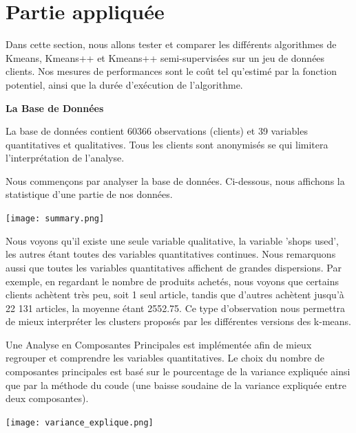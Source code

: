 \documentclass[12pt,a4paper]{book}
\newcommand{\1}{\mathds{1}}
\begin{document}
\section{Partie appliquée}

\vspace{5 mm}

\noindent
Dans cette section, nous allons tester et comparer les différents algorithmes de Kmeans, Kmeans++ et Kmeans++ semi-supervisées sur un jeu de données clients. Nos mesures de performances sont le coût tel qu'estimé par la fonction potentiel, ainsi que la durée d'exécution de l'algorithme.

\vspace{10 mm}

\noindent
{\Large \textbf{La Base de Données}}
\vspace{5 mm}

\noindent
La base de données contient 60366 observations (clients) et 39 variables quantitatives et qualitatives. Tous les clients sont anonymisés se qui limitera l'interprétation de l'analyse.

\noindent
Nous commençons par analyser la base de données. Ci-dessous, nous affichons la statistique d'une partie de nos données. 
\begin{center}
\texttt{[image: summary.png]}
\end{center}

\noindent
Nous voyons qu'il existe une seule variable qualitative, la variable 'shops used', les autres étant toutes des variables quantitatives continues. Nous remarquons aussi que toutes les variables quantitatives affichent de grandes dispersions. Par exemple, en regardant le nombre de produits achetés, nous voyons que certains clients achètent très peu, soit 1 seul article, tandis que d'autres achètent jusqu'à 22 131 articles, la moyenne étant 2552.75. Ce type d'observation nous permettra de mieux interpréter les clusters proposés par les différentes versions des k-means.

\noindent
Une Analyse en Composantes Principales est implémentée afin de mieux regrouper et comprendre les variables quantitatives. Le choix du nombre de composantes principales est basé sur le pourcentage de la variance expliquée ainsi que par la méthode du coude (une baisse soudaine de la variance expliquée entre deux composantes).

\begin{center}
\texttt{[image: variance\_explique.png]}
\end{center}
\end{document}
